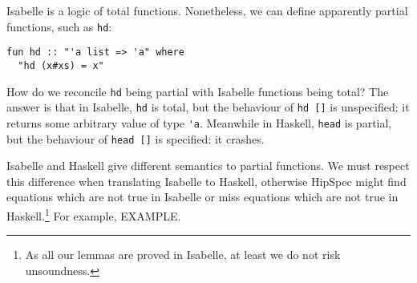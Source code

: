 Isabelle is a logic of total functions. Nonetheless, we can define
apparently partial functions, such as \verb|hd|:
\begin{verbatim}
fun hd :: "'a list => 'a" where
  "hd (x#xs) = x"
\end{verbatim}

How do we reconcile \verb|hd| being partial with Isabelle functions
being total? The answer is that in Isabelle, \verb|hd| is total, but
the behaviour of \verb|hd []| is unspecified: it returns some
arbitrary value of type \verb|'a|. Meanwhile in Haskell, \verb|head|
is partial, but the behaviour of \verb|head []| is specified: it
crashes.

Isabelle and Haskell give different semantics to partial functions. We
must respect this difference when translating Isabelle to Haskell,
otherwise HipSpec might find equations which are not true in Isabelle
or miss equations which are not true in Haskell.\footnote{As all our
lemmas are proved in Isabelle, at least we do not risk unsoundness.}
For example, EXAMPLE.

